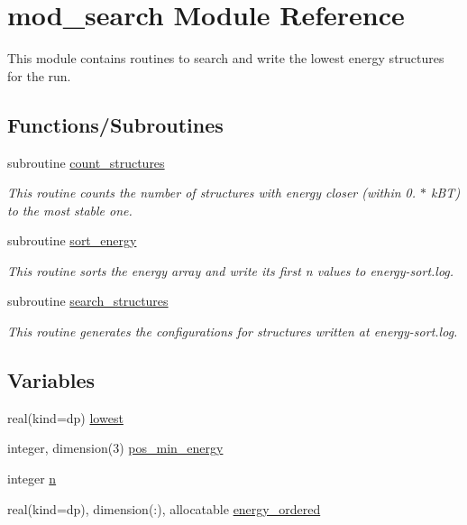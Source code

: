 \hypertarget{namespacemod__search}{}\section{mod\+\_\+search Module Reference}
\label{namespacemod__search}


This module contains routines to search and write the lowest energy structures for the run.  


\subsection*{Functions/\+Subroutines}
\begin{DoxyCompactItemize}
\item 
subroutine \hyperlink{namespacemod__search_a5026804a4e265b1a450eebc86cd81575}{count\+\_\+structures}
\begin{DoxyCompactList}\small\item\em This routine counts the number of structures with energy closer (within 0. $\ast$ k\+BT) to the most stable one. \end{DoxyCompactList}\item 
subroutine \hyperlink{namespacemod__search_a55e1f850472fe6cef190a6838ae61e51}{sort\+\_\+energy}
\begin{DoxyCompactList}\small\item\em This routine sorts the energy array and write its first n values to energy-\/sort.\+log. \end{DoxyCompactList}\item 
subroutine \hyperlink{namespacemod__search_ac11978e9ebdb6b101a09555f4742a4c9}{search\+\_\+structures}
\begin{DoxyCompactList}\small\item\em This routine generates the configurations for structures written at energy-\/sort.\+log. \end{DoxyCompactList}\end{DoxyCompactItemize}
\subsection*{Variables}
\begin{DoxyCompactItemize}
\item 
real(kind=dp) \hyperlink{namespacemod__search_a014567a8f5474b311cedf2f9b1dbda1a}{lowest}
\item 
integer, dimension(3) \hyperlink{namespacemod__search_a018a3c64ea9e25b0dfc15ebe763920cf}{pos\+\_\+min\+\_\+energy}
\item 
integer \hyperlink{namespacemod__search_a0c7388c12d8e6a95b8c3f9fd86321687}{n}
\item 
real(kind=dp), dimension(\+:), allocatable \hyperlink{namespacemod__search_a8ce72764a5658f7958ed5c473dd77706}{energy\+\_\+ordered}
\end{DoxyCompactItemize}


